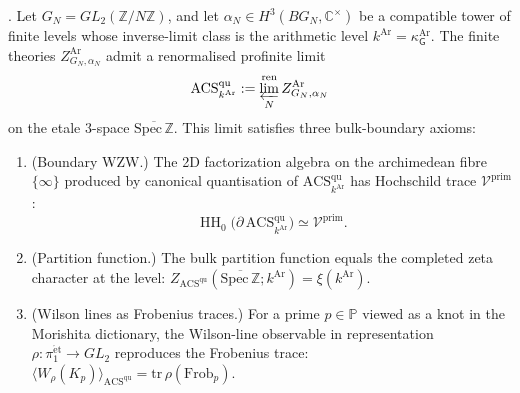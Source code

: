 \begin{conjecture}
\label{v4-arith:3d-acs:conj:qu-acs}
\ClaimStatusConjectured. Let \(G_{N}=GL_{2}(\mathbb Z/N\mathbb Z)\),
and let \(\alpha_{N}\in H^{3}(BG_{N},\mathbb C^{\times})\) be a
compatible tower of finite levels whose inverse-limit class is
the arithmetic level \(k^{\mathrm{Ar}}=\kappa^{\mathrm{Ar}}_{\mathsf G}\).
The finite theories \(Z^{\mathrm{Ar}}_{G_{N},\alpha_{N}}\) admit a
renormalised profinite limit
\[
\mathrm{ACS}^{\mathrm{qu}}_{k^{\mathrm{Ar}}}
:=\varprojlim_{N}^{\mathrm{ren}} Z^{\mathrm{Ar}}_{G_{N},\alpha_{N}}
\]
on the etale 3-space
\(\overline{\mathrm{Spec}\,\mathbb Z}\). This limit satisfies three
bulk-boundary axioms:
\begin{enumerate}
\item (Boundary WZW.) The 2D factorization algebra on the archimedean
fibre \(\{\infty\}\) produced by canonical quantisation of
\(\mathrm{ACS}^{\mathrm{qu}}_{k^{\mathrm{Ar}}}\) has Hochschild trace
\(\mathcal{V}^{\mathrm{prim}}\):
\[
\operatorname{HH}_{0}
\bigl(\partial\,\mathrm{ACS}^{\mathrm{qu}}_{k^{\mathrm{Ar}}}\bigr)
\simeq\mathcal{V}^{\mathrm{prim}}.
\]
\item (Partition function.) The bulk partition function equals the
completed zeta character at the level:
\(Z_{\mathrm{ACS}^{\mathrm{qu}}}(\overline{\mathrm{Spec}\,\mathbb{Z}};k^{\mathrm{Ar}})=\xi(k^{\mathrm{Ar}})\).
\item (Wilson lines as Frobenius traces.) For a prime \(p\in\mathbb{P}\)
viewed as a knot in the Morishita dictionary, the Wilson-line observable
in representation \(\rho:\pi_{1}^{\mathrm{\acute{e}t}}\to GL_{2}\) reproduces
the Frobenius trace:
\(\langle W_{\rho}(K_{p})\rangle_{\mathrm{ACS}^{\mathrm{qu}}}=\mathrm{tr}\,\rho(\mathrm{Frob}_{p})\).
\end{enumerate}
\end{conjecture}

